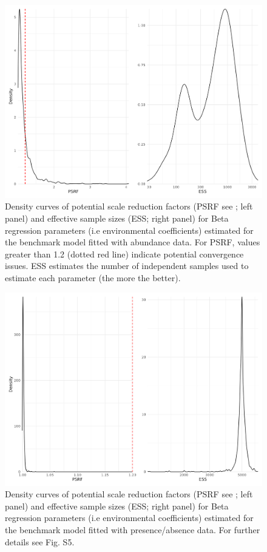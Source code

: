 \begin{figure}
\hypertarget{fig:chapt1bench_ab_beta}{%
\centering
\includegraphics{03-Chapitre1/figures/supplementary/fig_supp_conv_beta_PolychaetaAB.png}
\caption{Density curves of potential scale reduction factors (PSRF see
\textcite{Brooks_1998}; left panel) and effective sample sizes (ESS;
right panel) for Beta regression parameters (i.e environmental
coefficients) estimated for the benchmark model fitted with abundance
data. For PSRF, values greater than 1.2 (dotted red line) indicate
potential convergence issues. ESS estimates the number of independent
samples used to estimate each parameter (the more the
better).}\label{fig:chapt1bench_ab_beta}
}
\end{figure}

\begin{figure}
\hypertarget{fig:chapt1bench_pa_beta}{%
\centering
\includegraphics{03-Chapitre1/figures/supplementary/fig_supp_conv_beta_PolychaetaPA.png}
\caption{Density curves of potential scale reduction factors (PSRF see
\textcite{Brooks_1998}; left panel) and effective sample sizes (ESS;
right panel) for Beta regression parameters (i.e environmental
coefficients) estimated for the benchmark model fitted with
presence/absence data. For further details see Fig.
S5.}\label{fig:chapt1bench_pa_beta}
}
\end{figure}

